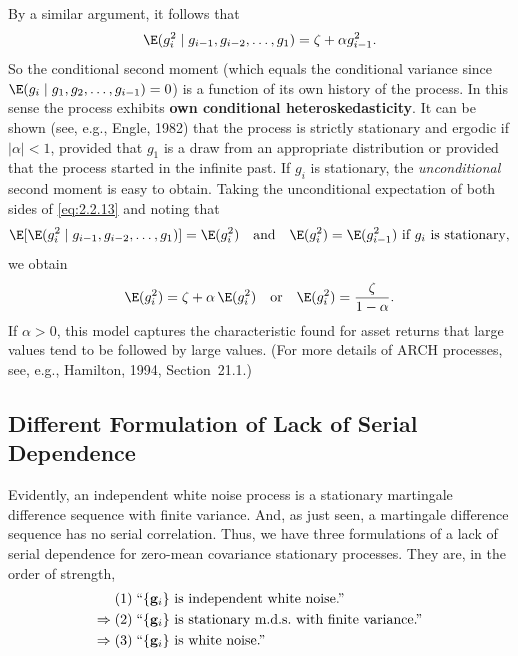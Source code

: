 By a similar argument, it follows that
\begin{equation}
  \E(g_i^2 \mid g_{i-1}, g_{i-2}, \ldots, g_1)
  = \zeta + \alpha g_{i-1}^2.
  \label{eq:2.2.13}
\end{equation}
So the conditional second moment (which equals the conditional variance since
$\E(g_i \mid g_1, g_2, \ldots, g_{i-1}) = 0$) is a function of its own history of
the process.  In this sense the process exhibits \textbf{own conditional
heteroskedasticity}.  It can be shown (see, e.g., Engle, 1982) that the process is
strictly stationary and ergodic if $|\alpha| < 1$, provided that $g_1$ is a draw
from an appropriate distribution or provided that the process started in the infinite
past.  If $g_i$ is stationary, the \emph{unconditional} second moment is easy to
obtain.  Taking the unconditional expectation of both sides of \eqref{eq:2.2.13} and
noting that
\[
  \E[\E(g_i^2 \mid g_{i-1}, g_{i-2}, \ldots, g_1)] = \E(g_i^2)
  \quad \text{and} \quad
  \E(g_i^2) = \E(g_{i-1}^2) \text{ if } g_i \text{ is stationary},
\]
we obtain
\begin{equation}
  \E(g_i^2) = \zeta + \alpha\,\E(g_i^2) \quad \text{or} \quad
  \E(g_i^2) = \frac{\zeta}{1 - \alpha}.
  \label{eq:2.2.14}
\end{equation}
If $\alpha > 0$, this model captures the characteristic found for asset returns that
large values tend to be followed by large values.  (For more details of ARCH
processes, see, e.g., Hamilton, 1994, Section~21.1.)

\subsection*{Different Formulation of Lack of Serial Dependence}

Evidently, an independent white noise process is a stationary martingale difference
sequence with finite variance.  And, as just seen, a martingale difference sequence
has no serial correlation.  Thus, we have three formulations of a lack of serial
dependence for zero-mean covariance stationary processes.  They are, in the order
of strength,
\begin{align}
  &(1)\;\text{``$\{\mathbf{g}_i\}$ is independent white noise.''} \notag \\
  \Rightarrow\; &(2)\;\text{``$\{\mathbf{g}_i\}$ is stationary m.d.s.\ with finite
  variance.''} \notag \\
  \Rightarrow\; &(3)\;\text{``$\{\mathbf{g}_i\}$ is white noise.''}
  \label{eq:2.2.15}
\end{align}

